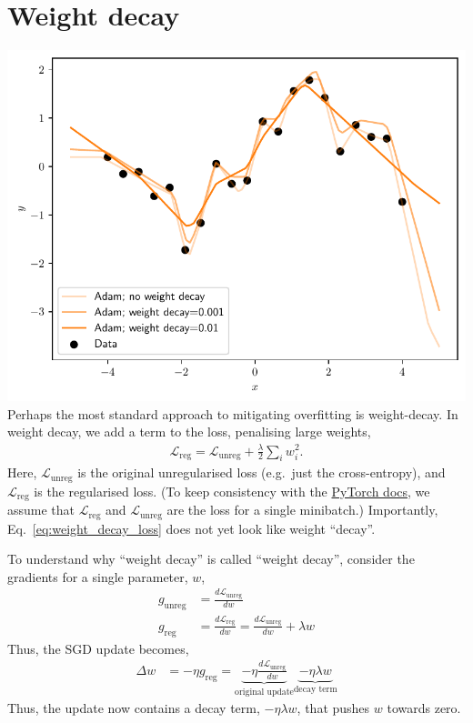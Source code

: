 \documentclass{article}
\newcommand{\dt}[2][]{\frac{d #1}{d #2}}
\newcommand{\0}{\mathbf{0}}
\renewcommand{\L}{\mathcal{L}}
\newcommand{\Lreg}{\L_\text{reg}}
\newcommand{\Lunreg}{\L_\text{unreg}}
\newcommand{\dLreg}{\dt[\Lreg]}
\newcommand{\dLunreg}{\dt[\Lunreg]}
\newcommand{\greg}{g_\text{reg}}
\newcommand{\gunreg}{g_\text{unreg}}
\begin{document}
\section{Weight decay}
\includegraphics[width=\textwidth]{weight_decay.pdf}
Perhaps the most standard approach to mitigating overfitting is weight-decay.
In weight decay, we add a term to the loss, penalising large weights,
\begin{align}
  \label{eq:weight_decay_loss}
  \Lreg = \Lunreg + \tfrac{\lambda}{2} \sum_i w_i^2.
\end{align}
Here, $\Lunreg$ is the original unregularised loss (e.g.\ just the cross-entropy), and $\Lreg$ is the regularised loss.
(To keep consistency with the \href{https://pytorch.org/docs/stable/generated/torch.optim.SGD.html}{PyTorch docs}, we assume that $\Lreg$ and $\Lunreg$ are the loss for a single minibatch.)
Importantly, Eq.~\eqref{eq:weight_decay_loss} does not yet look like weight ``decay''.  

To understand why ``weight decay'' is called ``weight decay'', consider the gradients for a single parameter, $w$,
\begin{align}
  \gunreg &= \dLunreg{w}\\
  \greg &= \dLreg{w} = \dLunreg{w} + \lambda w
\end{align}
Thus, the SGD update becomes,
\begin{align}
  \Delta w &= - \eta \greg = \underbrace{- \eta \dLunreg{w}}_\text{original update} \underbrace{- \eta \lambda w}_\text{decay term}
\end{align}
Thus, the update now contains a decay term, $-\eta \lambda w$, that pushes $w$ towards zero.
\end{document}
